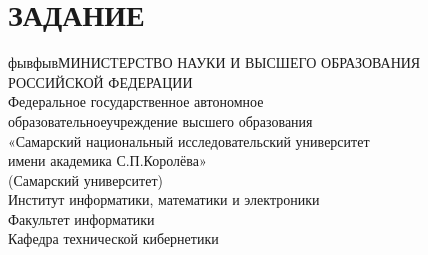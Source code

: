 
\setcounter{page}{2}






\section*{ЗАДАНИЕ}{

\center
{фывфывМИНИСТЕРСТВО НАУКИ И ВЫСШЕГО ОБРАЗОВАНИЯ РОССИЙСКОЙ ФЕДЕРАЦИИ\\
{Федеральное государственное автономное  \\[-0.2cm] 
образовательноеучреждение  высшего образования\\[-0.2cm] 
«Самарский национальный исследовательский университет \\[-0.2cm] 
имени академика С.П.Королёва»\\[-0.2cm]
(Самарский университет)}\\[1cm]
{Институт информатики, математики и электроники}\\[-0.2cm]
{Факультет информатики}\\[-0.2cm]
{Кафедра технической кибернетики}\\[1cm]
}


}
\newpage
